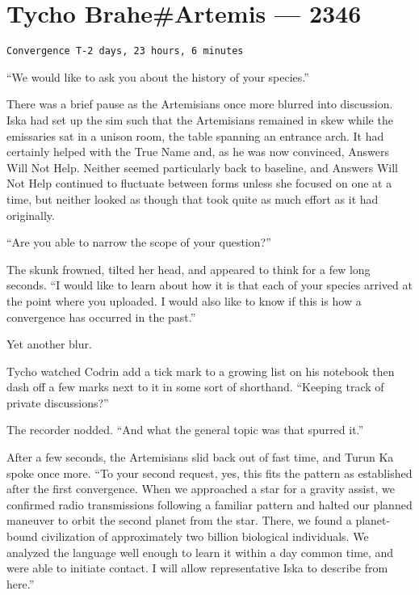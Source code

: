 \hypertarget{tycho-braheartemis-2346}{%
\chapter{Tycho Brahe\#Artemis — 2346}\label{tycho-braheartemis-2346}}

\begin{verbatim}
Convergence T-2 days, 23 hours, 6 minutes
\end{verbatim}

``We would like to ask you about the history of your species.''

There was a brief pause as the Artemisians once more blurred into discussion. Iska had set up the sim such that the Artemisians remained in skew while the emissaries sat in a unison room, the table spanning an entrance arch. It had certainly helped with the True Name and, as he was now convinced, Answers Will Not Help. Neither seemed particularly back to baseline, and Answers Will Not Help continued to fluctuate between forms unless she focused on one at a time, but neither looked as though that took quite as much effort as it had originally.

``Are you able to narrow the scope of your question?''

The skunk frowned, tilted her head, and appeared to think for a few long seconds. ``I would like to learn about how it is that each of your species arrived at the point where you uploaded. I would also like to know if this is how a convergence has occurred in the past.''

Yet another blur.

Tycho watched Codrin add a tick mark to a growing list on his notebook then dash off a few marks next to it in some sort of shorthand. ``Keeping track of private discussions?''

The recorder nodded. ``And what the general topic was that spurred it.''

After a few seconds, the Artemisians slid back out of fast time, and Turun Ka spoke once more. ``To your second request, yes, this fits the pattern as established after the first convergence. When we approached a star for a gravity assist, we confirmed radio transmissions following a familiar pattern and halted our planned maneuver to orbit the second planet from the star. There, we found a planet-bound civilization of approximately two billion biological individuals. We analyzed the language well enough to learn it within a day common time, and were able to initiate contact. I will allow representative Iska to describe from here.''

